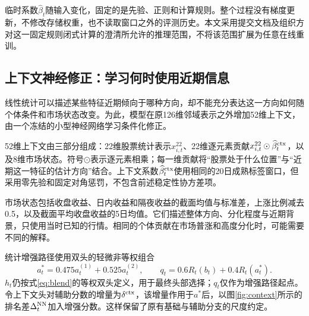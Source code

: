 \documentclass[UTF8,11pt,a4paper,fontset=fandol]{ctexart}
\begin{document}
临时系数$\widehat\beta_t$随输入变化，固定的是先验、正则和计算规则。整个过程没有梯度更新，不修改存储权重，也不读取窗口之外的评测历史。本文采用提交文档及组织方对这一固定规则闭式计算的澄清所允许的推理范围\cite{competition}，不将该范围扩展为任意在线重训。

\subsection{上下文神经修正：学习何时使用近期信息}\label{sec:context}
线性统计可以描述某些特征近期倾向于哪种方向，却不能充分表达这一方向如何随个体条件和市场状态改变。为此，模型在原126维邻域表示之外增加52维上下文，由一个冻结的小型神经网络学习条件化修正。

52维上下文由三部分组成：22维股票统计表示$x^{22}_{i,t}$、22维逐元素贡献$x^{22}_{i,t}\odot\widehat\beta^{\rm ctx}_t$，以及8维市场状态。符号$\odot$表示逐元素相乘；每一维贡献将“股票处于什么位置”与“近期这一特征的估计方向”结合。上下文系数$\widehat\beta^{\rm ctx}_t$使用相同的20日成熟标签窗口，但采用零先验和固定对角惩罚，不包含前述稳定性协方差项。

市场状态包括收盘收益、日内收益和隔夜收益的截面均值与标准差，上涨比例减去0.5，以及截面平均收盘收益的5日均值。它们描述整体方向、分化程度与近期背景，只使用当时已知的行情。相同的个体贡献在市场普涨和高度分化时，可能需要不同的解释。

统计增强路径使用双头的轻微非等权组合
\begin{equation}
 a_t^*=0.475a_t^{(1)}+0.525a_t^{(2)},\qquad
 q_t=0.6R_t(b_t)+0.4R_t(a_t^*).
 \label{eq:qstart}
\end{equation}
$h_t$仍按式\eqref{eq:blend}的等权双头定义，用于最终头部选择；$q_t$仅作为增强路径起点。令上下文头对辅助分数的增量为$\delta^{\rm ctx}$，该增量作用于$a^*$后，以图\ref{fig:context}所示的排名差$\Delta_t^{\rm NN}$加入增强分数。这样保留了原有基础与辅助分支的尺度约定。
\end{document}
